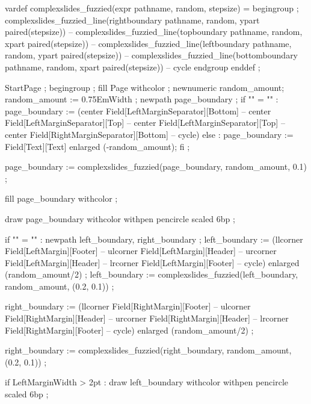   vardef complexslides_fuzzied(expr pathname, random, stepsize) =
     begingroup ;
           complexslides_fuzzied_line(rightboundary  pathname, random, ypart paired(stepsize))
        -- complexslides_fuzzied_line(topboundary    pathname, random, xpart paired(stepsize))
        -- complexslides_fuzzied_line(leftboundary   pathname, random, ypart paired(stepsize))
        -- complexslides_fuzzied_line(bottomboundary pathname, random, xpart paired(stepsize))
        -- cycle
     endgroup
  enddef ;
\stopMPdefinitions

  StartPage ;
  begingroup ;
  fill Page withcolor  ;
  newnumeric random_amount; random_amount := 0.75EmWidth ;
  newpath page_boundary ;
  if "\currentmakeup" = "" :
      page_boundary := (center Field[LeftMarginSeparator][Bottom]
                     -- center Field[LeftMarginSeparator][Top]
                     -- center Field[LeftMarginSeparator][Top]
                     -- center  Field[RightMarginSeparator][Bottom]
                     -- cycle)
  else :
      page_boundary := Field[Text][Text] enlarged (-random_amount);
  fi ;

  page_boundary := complexslides_fuzzied(page_boundary, random_amount, 0.1) ;

  fill page_boundary withcolor  ;

  draw page_boundary withcolor 
       withpen pencircle scaled 6bp ;

  if "\currentmakeup" = "" :
     newpath left_boundary, right_boundary ;
      left_boundary := (llcorner Field[LeftMargin][Footer]
                     -- ulcorner Field[LeftMargin][Header]
                     -- urcorner Field[LeftMargin][Header]
                     -- lrcorner Field[LeftMargin][Footer]
                     -- cycle)
                     enlarged (random_amount/2) ;
      left_boundary  := complexslides_fuzzied(left_boundary, random_amount, (0.2, 0.1)) ;

      right_boundary := (llcorner Field[RightMargin][Footer]
                      -- ulcorner Field[RightMargin][Header]
                      -- urcorner Field[RightMargin][Header]
                      -- lrcorner Field[RightMargin][Footer]
                      -- cycle)
                      enlarged (random_amount/2) ;

      right_boundary := complexslides_fuzzied(right_boundary, random_amount, (0.2, 0.1)) ;

     if LeftMarginWidth > 2pt :
        draw left_boundary
           withcolor 
           withpen pencircle scaled 6bp ;

